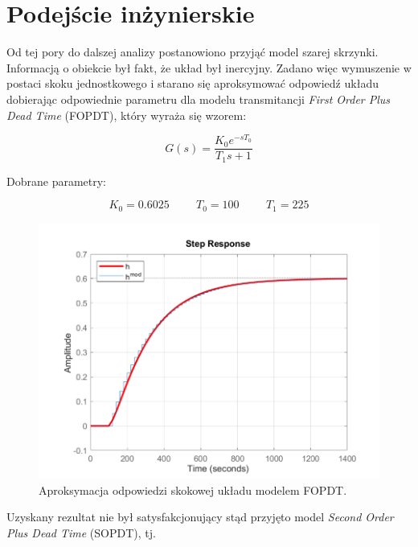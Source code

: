 \newpage

\section{Podejście inżynierskie}
Od tej pory do dalszej analizy postanowiono przyjąć model szarej skrzynki. Informacją o obiekcie był fakt, że układ był inercyjny. Zadano więc wymuszenie w postaci skoku jednostkowego i starano się aproksymować odpowiedź układu dobierając odpowiednie parametru dla modelu transmitancji \textit{First Order Plus Dead Time} (FOPDT), który wyraża się wzorem:

\begin{equation}
G(s) = \frac{K_0e^{-sT_0}}{T_1s + 1}
\end{equation}

\noindent Dobrane parametry:

\begin{equation}
K_0 = \num{0.6025} \hspace{1cm} T_0 = 100 \hspace{1cm} T_1 = 225
\end{equation}

\begin{figure}[h!]
\centering
\includegraphics[width=\textwidth]{pictures/model_fopdt}
\caption{Aproksymacja odpowiedzi skokowej układu modelem FOPDT.}
\end{figure}

\newpage

Uzyskany rezultat nie był satysfakcjonujący stąd przyjęto model \textit{Second Order Plus Dead Time} (SOPDT), tj.

